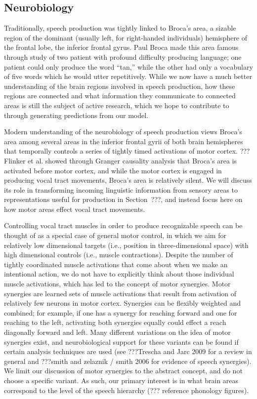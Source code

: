 \subsection{Neurobiology}

Traditionally, speech production
was tightly linked to Broca's area,
a sizable region of the dominant
(usually left, for right-handed individuals)
hemisphere of the frontal lobe,
the inferior frontal gyrus.
Paul Broca made this area famous
through study of two patient
with profound difficulty producing language;
one patient could only produce the word ``tan,''
while the other had only a vocabulary
of five words which he would utter repetitively.
While we now have a much better understanding
of the brain regions
involved in speech production,
how these regions are connected
and what information they communicate
to connected areas is still
the subject of active research,
which we hope to contribute to
through generating predictions
from our model.

Modern understanding of
the neurobiology of speech production
views Broca's area among several
areas in the inferior frontal gyrii
of both brain hemispheres
that temporally controls a series
of tightly timed activations
of motor cortex.
??? Flinker et al.
showed through Granger causality analysis
that Broca's area is activated
before motor cortex,
and while the motor cortex is
engaged in producing vocal tract movements,
Broca's area is relatively silent.
We will discuss its role in
transforming incoming linguistic
information from sensory areas
to representations useful for production
in Section~???,
and instead focus here on
how motor areas effect vocal tract movements.

Controlling vocal tract muscles
in order to produce recognizable speech
can be thought of as a special case of
general motor control,
in which we aim for relatively
low dimensional targets
(i.e., position in three-dimensional space)
with high dimensional controls
(i.e., muscle contractions).
Despite the number of tightly coordinated
muscle activations that come about
when we make an intentional action,
we do not have to explicitly
think about those individual muscle activations,
which has led to the concept
of motor synergies.
Motor synergies are learned sets of
muscle activations that result
from activation of relatively few
neurons in motor cortex.
Synergies can be flexibly weighted
and combined;
for example, if one has a synergy
for reaching forward and one for
reaching to the left,
activating both synergies
equally could effect
a reach diagonally forward and left.
Many different variations
on the idea of motor synergies exist,
and neurobiological support
for these variants
can be found if certain
analysis techniques are used
(see ???Trescha and Jarc 2009
for a review in general
and ???smith and zelaznik / smith 2006
for evidence of speech synergies).
We limit our discussion
of motor synergies to the abstract concept,
and do not choose a specific variant.
As such, our primary interest
is in what brain areas correspond
to the level of the speech hierarchy
(??? reference phonology figures).

